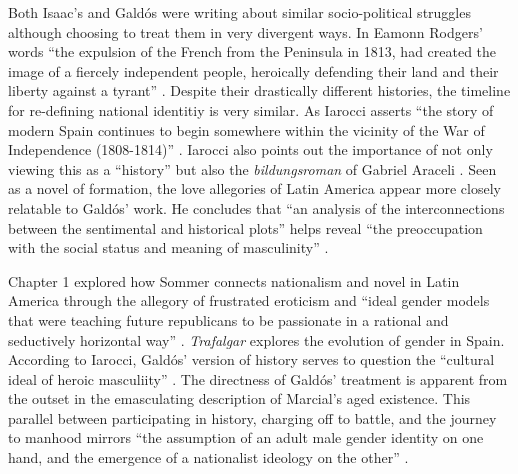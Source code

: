 \documentclass[12pt]{report}
\begin{document}
Both Isaac's and Galdós were writing about similar socio-political struggles although choosing to treat them in very divergent ways.
In Eamonn Rodgers' words \enquote{the expulsion of the French from the Peninsula in 1813, had created the image of a fiercely independent people, heroically defending their land and their liberty against a tyrant} \cite[465]{Rodgers2005}.
Despite their drastically different histories, the timeline for re-defining national identitiy is very similar.
As Iarocci asserts \enquote{the story of modern Spain continues to begin somewhere within the vicinity of the War of Independence (1808-1814)} \cite[185]{Iarocci2003}.
Iarocci also points out the importance of not only viewing this as a \enquote{history} but also the \textit{bildungsroman} of Gabriel Araceli \cite[189]{Iarocci2003}.
Seen as a novel of formation, the love allegories of Latin America appear more closely relatable to Galdós' work.
He concludes that \enquote{an analysis of the interconnections between the sentimental and historical plots} helps reveal \enquote{the preoccupation with the social status and meaning of masculinity} \cite[190]{Iarocci2003}.

Chapter 1 explored how Sommer connects nationalism and novel in Latin America through the allegory of frustrated eroticism and \enquote{ideal gender models that were teaching future republicans to be passionate in a rational and seductively horizontal way} \cite[191]{Iarocci2003}. 
\textit{Trafalgar} explores the evolution of gender in Spain.
According to Iarocci, Galdós' version of history serves to question the \enquote{cultural ideal of heroic masculiity} \cite[191]{Iarocci2003}.
The directness of Galdós' treatment is apparent from the outset in the emasculating description of Marcial's aged existence.
This parallel between participating in history, charging off to battle, and the journey to manhood mirrors \enquote{the assumption of an adult male gender identity on one hand, and the emergence of a nationalist ideology on the other} \cite[193]{Iarocci2003}.
\end{document}

